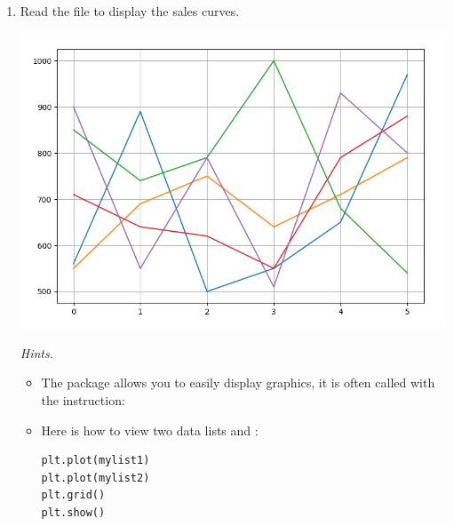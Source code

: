 \documentclass[11pt,class=report,crop=false]{standalone}
\begin{document}
\begin{activite}
\begin{enumerate}
  \item Read the  file to display the sales curves.
  \begin{center}
\includegraphics[scale=\myscale,scale=0.4]{screen-files-2c-en}
\end{center}  

  \emph{Hints.} 
  \begin{itemize}
    	\item The  package allows you to easily display graphics, it is often called with the instruction:  	
   
   \item Here is how to view two data lists  and :
\begin{center}
\begin{minipage}{0.4\textwidth}
\begin{lstlisting}
plt.plot(mylist1)
plt.plot(mylist2)
plt.grid()
plt.show()
\end{lstlisting}
\end{minipage}
\end{center}


   \end{itemize}
\end{enumerate}   
     
\end{activite}

\end{document}
